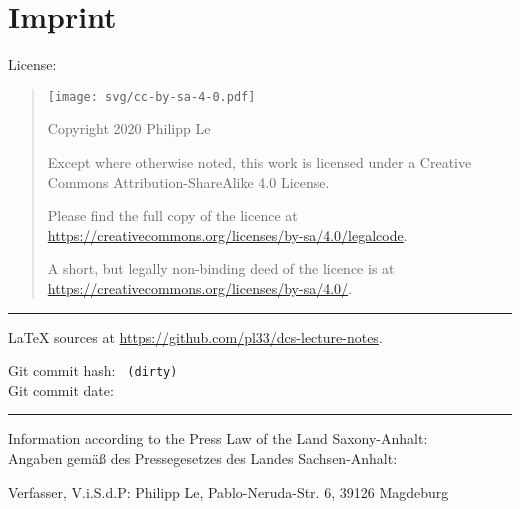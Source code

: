 %
%
%

\chapter*{Imprint}

{
\small

License:

\begin{quote}
	\texttt{[image: svg/cc-by-sa-4-0.pdf]}
		
	Copyright \textcopyright{} 2020 Philipp Le
	
	Except where otherwise noted, this work is licensed under a
	Creative Commons Attribution-ShareAlike 4.0 License.
	
	Please find the full copy of the licence at \url{https://creativecommons.org/licenses/by-sa/4.0/legalcode}.
	
	A short, but legally non-binding deed of the licence is at \url{https://creativecommons.org/licenses/by-sa/4.0/}.
\end{quote}

\vspace{1.5em}

\hrule{}

\vspace{1.5em}

\LaTeX{} sources at \url{https://github.com/pl33/dcs-lecture-notes}.

Git commit hash: \texttt{\VcsCommitHashLong{} \ifdefined\VcsIsClean \else (dirty) \fi}\\
Git commit date: \texttt{\VcsCommitTime}

\vspace{1.5em}

\hrule{}

\vspace{1.5em}

Information according to the Press Law of the Land Saxony-Anhalt:\\
Angaben gem\"a{}{\ss} des Pressegesetzes des Landes Sachsen-Anhalt:

Verfasser, V.i.S.d.P: Philipp Le, Pablo-Neruda-Str. 6, 39126 Magdeburg

}
